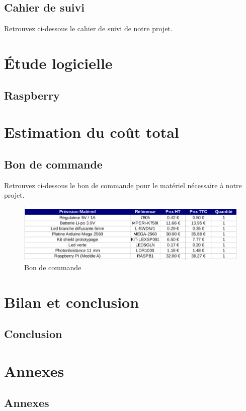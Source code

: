 \documentclass[12pt,titlepage,a4paper]{report}
\begin{document}
		\chapter{Cahier de suivi}
		\minitoc
		Retrouvez ci-dessous le cahier de suivi de notre projet.
		


	\part{Étude logicielle}
		\chapter{Raspberry}
		\minitoc
		


	\part{Estimation du coût total}
		\chapter{Bon de commande}
		Retrouvez ci-dessous le bon de commande pour le matériel nécessaire à notre 	projet.
		\begin{figure}[h]
			\centering
			\includegraphics[width=550px]{images/lextronic.png}
			\caption{Bon de commande}
		\end{figure}


	\part{Bilan et conclusion}
		\chapter{Conclusion}
		


	\part{Annexes}
		\chapter{Annexes}
		
\end{document}
